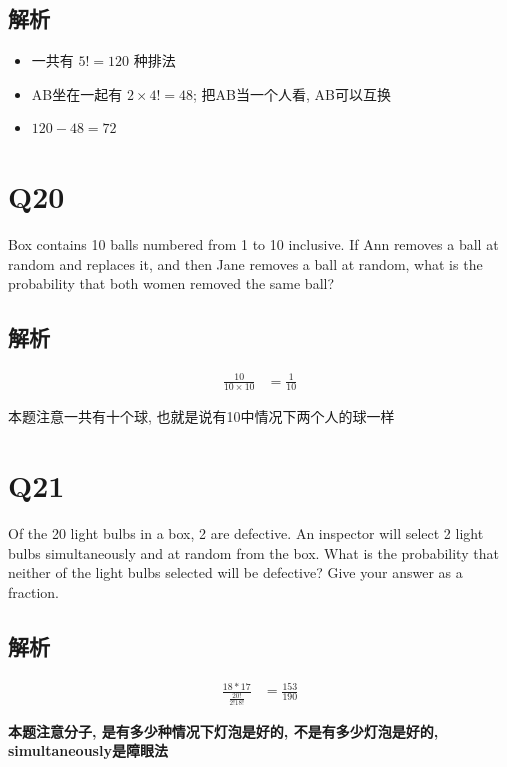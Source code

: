   \subsection{解析}

    \begin{itemize}
      \item 一共有 $ 5! = 120 $ 种排法
      \item AB坐在一起有 $ 2 \times 4! = 48 $; 把AB当一个人看, AB可以互换
      \item $ 120 - 48 = 72 $
    \end{itemize}

\section{Q20}

  Box contains 10 balls numbered from 1 to 10 inclusive. If Ann removes a
  ball at random and replaces it, and then Jane removes a ball at random,
  what is the probability that both women removed the same ball?

  \subsection{解析}

    \begin{align*}
      \frac{10}{10 \times 10} &= \frac{1}{10}
    \end{align*}

    本题注意一共有十个球, 也就是说有10中情况下两个人的球一样

\section{Q21}

  Of the 20 light bulbs in a box, 2 are defective. An inspector will select
  2 light bulbs simultaneously and at random from the box. What is the
  probability that neither of the light bulbs selected will be defective?
  Give your answer as a fraction.

  \subsection{解析}

    \begin{align*}
      \frac{18 * 17}{\frac{20!}{2! 18!}} &= \frac{153}{190}
    \end{align*}

    \textbf{本题注意分子, 是有多少种情况下灯泡是好的, 不是有多少灯泡是好的,
    simultaneously是障眼法}


